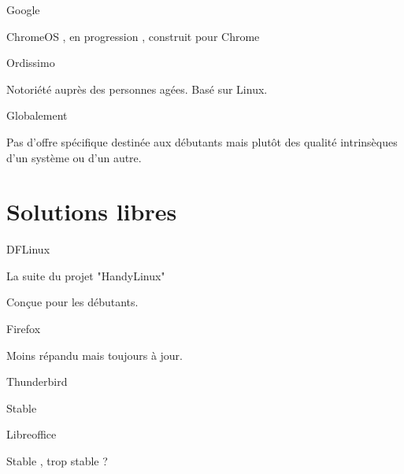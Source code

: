 \documentclass[xcolor=svgnames]{beamer}
\begin{document}
    \begin{frame}{Google}
    
        ChromeOS \pause, en progression \pause, construit pour Chrome
        
    \end{frame}
    
    \begin{frame}{Ordissimo}
        
        Notoriété auprès des personnes agées. \pause Basé sur Linux.
        
    \end{frame}
    
    \begin{frame}{Globalement}
    
        Pas d'offre spécifique destinée aux débutants \pause mais plutôt des qualité intrinsèques d'un système ou d'un autre.
        
    \end{frame}
    
    
\section{Solutions libres}

    \begin{frame}{DFLinux}
    
        La suite du projet "HandyLinux" \pause
        
        Conçue pour les débutants.   
        
    \end{frame}
    
    \begin{frame}{Firefox}
    
        Moins répandu \pause mais toujours à jour.
        
    \end{frame}
    
    \begin{frame}{Thunderbird}
    
        Stable
        
    \end{frame}
    
    \begin{frame}{Libreoffice}
    
        Stable \pause, trop stable ?
        
    \end{frame}
    
\end{document}

